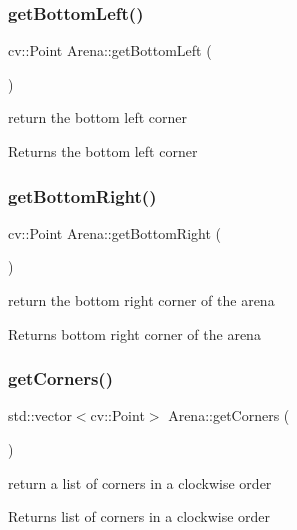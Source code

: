 \subsubsection{\texorpdfstring{get\+Bottom\+Left()}{getBottomLeft()}}
{\footnotesize\ttfamily cv\+::\+Point Arena\+::get\+Bottom\+Left (\begin{DoxyParamCaption}{ }\end{DoxyParamCaption})}

return the bottom left corner \begin{DoxyReturn}{Returns}
the bottom left corner 
\end{DoxyReturn}
\mbox{\label{class_arena_ac62870a7bfa41baa7d38c4f7373cf3f5}} 
\subsubsection{\texorpdfstring{get\+Bottom\+Right()}{getBottomRight()}}
{\footnotesize\ttfamily cv\+::\+Point Arena\+::get\+Bottom\+Right (\begin{DoxyParamCaption}{ }\end{DoxyParamCaption})}

return the bottom right corner of the arena \begin{DoxyReturn}{Returns}
bottom right corner of the arena 
\end{DoxyReturn}
\mbox{\label{class_arena_a67171d93c7aff0f9d8bd3ee0596e9033}} 
\subsubsection{\texorpdfstring{get\+Corners()}{getCorners()}}
{\footnotesize\ttfamily std\+::vector$<$cv\+::\+Point$>$ Arena\+::get\+Corners (\begin{DoxyParamCaption}{ }\end{DoxyParamCaption})}

return a list of corners in a clockwise order \begin{DoxyReturn}{Returns}
list of corners in a clockwise order 
\end{DoxyReturn}
\mbox{\label{class_arena_ae7219e6d298213627a0c671e5c5f9536}} 
